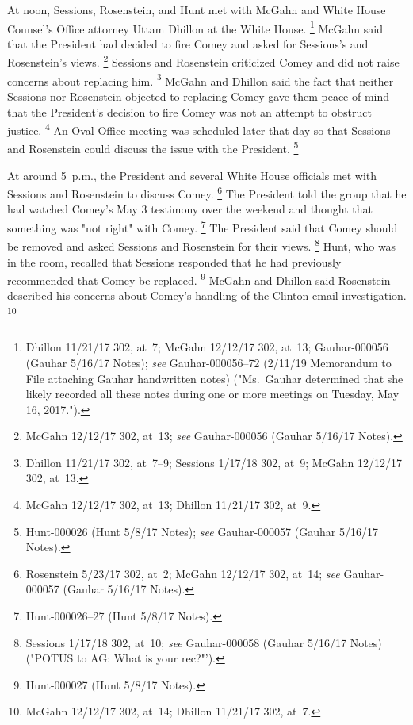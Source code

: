 {At noon, Sessions, Rosenstein, and Hunt met with McGahn and White House Counsel's Office attorney Uttam Dhillon at the White House.%
\footnote{Dhillon 11/21/17 302, at~7;
McGahn 12/12/17 302, at~13;
Gauhar-000056 (Gauhar 5/16/17 Notes);
\textit{see} Gauhar-000056--72 (2/11/19 Memorandum to File attaching Gauhar handwritten notes) ("Ms.~Gauhar determined that she likely recorded all these notes during one or more meetings on Tuesday, May 16, 2017.").}
McGahn said that the President had decided to fire Comey and asked for Sessions's and Rosenstein's views.%
\footnote{McGahn 12/12/17 302, at~13;
\textit{see} Gauhar-000056 (Gauhar 5/16/17 Notes).}
Sessions and Rosenstein criticized Comey and did not raise concerns about replacing him.%
\footnote{Dhillon 11/21/17 302, at~7--9;
Sessions 1/17/18 302, at~9;
McGahn 12/12/17 302, at~13.}
McGahn and Dhillon said the fact that neither Sessions nor Rosenstein objected to replacing Comey gave them peace of mind that the President's decision to fire Comey was not an attempt to obstruct justice.%
\footnote{McGahn 12/12/17 302, at~13;
Dhillon 11/21/17 302, at~9.}
An Oval Office meeting was scheduled later that day so that Sessions and Rosenstein could discuss the issue with the President.%
\footnote{Hunt-000026 (Hunt 5/8/17 Notes);
\textit{see} Gauhar-000057 (Gauhar 5/16/17 Notes).}

At around 5~p.m., the President and several White House officials met with Sessions and Rosenstein to discuss Comey.%
\footnote{Rosenstein 5/23/17 302, at~2;
McGahn 12/12/17 302, at~14;
\textit{see} Gauhar-000057 (Gauhar 5/16/17 Notes).}
The President told the group that he had watched Comey's May 3 testimony over the weekend and thought that something was "not right" with Comey.%
\footnote{Hunt-000026--27 (Hunt 5/8/17 Notes).}
The President said that Comey should be removed and asked Sessions and Rosenstein for their views.%
\footnote{Sessions 1/17/18 302, at~10;
\textit{see} Gauhar-000058 (Gauhar 5/16/17 Notes) ("POTUS to AG: What is your rec?"').}
Hunt, who was in the room, recalled that Sessions responded that he had previously recommended that Comey be replaced.%
\footnote{Hunt-000027 (Hunt 5/8/17 Notes).}
McGahn and Dhillon said Rosenstein described his concerns about Comey's handling of the Clinton email investigation.%
\footnote{McGahn 12/12/17 302, at~14;
Dhillon 11/21/17 302, at~7.}

}
